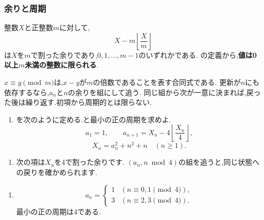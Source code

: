 \subsubsection{余りと周期}\label{節：余りと周期}
整数$X$と正整数$m$に対して,
\[
  X-m\left\lfloor\frac Xm\right\rfloor
\]
は$X$を$m$で割った余りであり,$0,1,\ldots,m-1$のいずれかである.
の定義から,\textbf{値は0以上$m$未満の整数に限られる}.

$x\equiv y\pmod m$は,$x-y$が$m$の倍数であることを表す合同式である.
更新が$n$にも依存するなら,$a_n$と$n$の余りを組にして追う.
同じ組から次が一意に決まれば,戻った後は繰り返す.初項から周期的とは限らない.

\noindent {}\par\nobreak
\begin{enumerate}[label=(\arabic*),parsep=3pt,beginpenalty=10000,format=\bookitemlink{example-gauss-role-3}{problem}{answer}]
  \item {}を次のように定める.と最小の正の周期を求めよ.
    \[
      a_1=1,\qquad
      a_{n+1}=X_n-4\left\lfloor\frac{X_n}{4}\right\rfloor,
    \]
    \[
      X_n=a_n^2+n^2+n\quad(n\ge1).
    \]
\end{enumerate}

\noindent {}\par\nobreak
\begin{enumerate}[label=(\arabic*),parsep=3pt,beginpenalty=10000,format=\bookitemlink{example-gauss-role-3}{hint}{problem}]
  \item 次の項は$X_n$を4で割った余りです.
    $(a_n,n\bmod4)$の組を追うと,同じ状態への戻りを確かめられます.
\end{enumerate}

\noindent {}\par\nobreak
\begin{enumerate}[label=(\arabic*),parsep=3pt,beginpenalty=10000,format=\bookitemlink{example-gauss-role-3}{answer}{problem}]
  \item \[
      a_n=
      \begin{cases}
        1 & (n\equiv0,1\pmod4),\\
        3 & (n\equiv2,3\pmod4).
      \end{cases}
    \]
    最小の正の周期は4である.
\end{enumerate}

